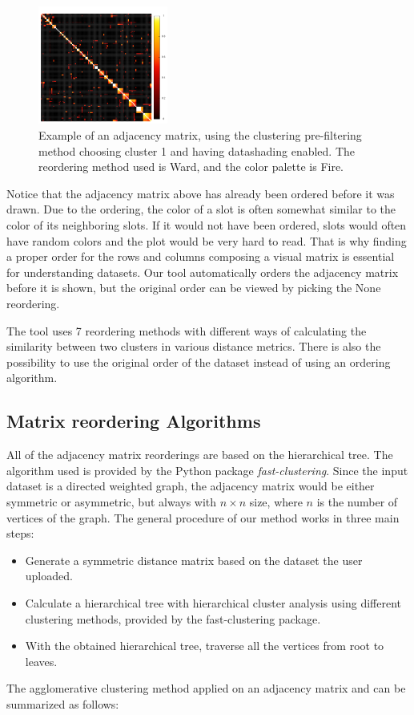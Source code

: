 \documentclass[journal]{vgtc}                %
\begin{document}
\begin{figure}[hbt]
    \centering
    \includegraphics[width=0.38\textwidth]{example_matrix.png}
    \caption{Example of an adjacency matrix, using the clustering pre-filtering method choosing cluster 1 and having datashading enabled. The reordering method used is Ward, and the color palette is Fire.}
    \label{fig:AMExample}
\end{figure}

Notice that the adjacency matrix above has already been ordered before it was drawn. Due to the ordering, the color of a slot is often somewhat similar to the color of its neighboring slots. If it would not have been ordered, slots would often have random colors and the plot would be very hard to read. That is why finding a proper order for the rows and columns composing a visual matrix is essential for understanding datasets. Our tool automatically orders the adjacency matrix before it is shown, but the original order can be viewed by picking the None reordering.

The tool uses 7 reordering methods with different ways of calculating the similarity between two clusters in various distance metrics. There is also the possibility to use the original order of the dataset instead of using an ordering algorithm.

\subsection{Matrix reordering Algorithms} \label{sect:AMreorderings} %
All of the adjacency matrix reorderings are based on the hierarchical tree. The algorithm used is provided by the Python package \textit{fast-clustering}\cite{fastercluster}. Since the input dataset is a directed weighted graph, the adjacency matrix would be either symmetric or asymmetric, but always with $n \times n$ size, where $n$ is the number of vertices of the graph. 
The general procedure of our method works in three main steps\cite{DBLP:journals/cgf/BehrischBRSF16}:
\begin{itemize}
    \setlength\itemsep{0em}
    \item Generate a symmetric distance matrix based on the dataset the user uploaded.
    \item Calculate a hierarchical tree with hierarchical cluster analysis using different clustering methods, provided by the fast-clustering package.
    \item With the obtained hierarchical tree, traverse all the vertices from root to leaves. 
\end{itemize}
The agglomerative clustering method applied on an adjacency matrix and can be summarized as follows:
\end{document}
